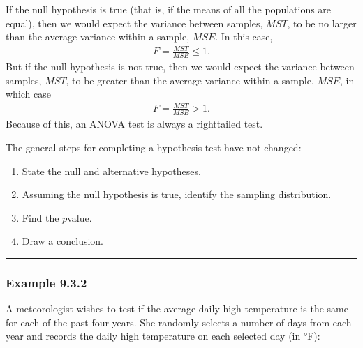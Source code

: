\documentclass[letterpaper,10pt,english]{jupyterBook}
\begin{document}
\sphinxAtStartPar
If the null hypothesis is true (that is, if the means of all the populations are equal), then we would expect the variance between samples, \(MST\), to be no larger than the average variance within a sample, \(MSE\). In this case,
\begin{equation*}
\begin{split}F = \frac{MST}{MSE} \leq 1.\end{split}
\end{equation*}
\sphinxAtStartPar
But if the null hypothesis is not true, then we would expect the variance between samples, \(MST\), to be greater than the average variance within a sample, \(MSE\), in which case
\begin{equation*}
\begin{split}F = \frac{MST}{MSE} > 1.\end{split}
\end{equation*}
\sphinxAtStartPar
Because of this, an ANOVA test is always a right\sphinxhyphen{}tailed test.

\sphinxAtStartPar
The general steps for completing a hypothesis test have not changed:
\begin{enumerate}
%
\item {} 
\sphinxAtStartPar
State the null and alternative hypotheses.

\item {} 
\sphinxAtStartPar
Assuming the null hypothesis is true, identify the sampling distribution.

\item {} 
\sphinxAtStartPar
Find the \(p\)\sphinxhyphen{}value.

\item {} 
\sphinxAtStartPar
Draw a conclusion.

\end{enumerate}


\bigskip\hrule\bigskip



\subsubsection{Example 9.3.2}
\label{\detokenize{Ch9 Hypothesis Tests of Two or More Populations/9.3 ANOVA:example-9-3-2}}
\sphinxAtStartPar
A meteorologist wishes to test if the average daily high temperature is the same for each of the past four years. She randomly selects a number of days from each year and records the daily high temperature on each selected day (in °F):
\end{document}
